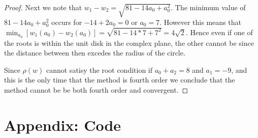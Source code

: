 \documentclass[10pt,a4paper]{article}
\begin{document}
\begin{proof}
Next we note that $w_1 - w_2 = \sqrt{81 - 14 a_0 + a_0^2}$.  The minimum value of $81 - 14 a_0 + a_0^2$ occurs for $-14 + 2 a_0 =0$ or $a_0 = 7$.  However this means that $\min_{a_0} [w_1(a_0) - w_2(a_0)] = \sqrt{81 - 14*7+7^2} = 4 \sqrt{2}$.  Hence even if one of the roots is within the unit disk in the complex plane, the other cannot be since the distance between then excedes the radius of the circle.

Since $\rho(w)$ cannot satisy the root condition if $a_0 + a_2 = 8$ and $a_1 = -9$, and this is the only time that the method is fourth order we conclude that the method cannot be be both fourth order and convergent.
\end{proof}

\section{Appendix: Code}
\end{document}
